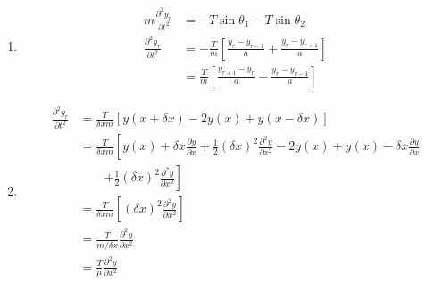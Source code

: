 \documentclass{article}
\begin{document}
\begin{enumerate}
  \item

        \begin{align*}
          m \frac{\partial^2 y_r}{\partial t^2} & = - T \sin \theta_1 - T \sin \theta_2                                               \\
          \frac{\partial^2 y_r}{\partial t^2}   & = -\frac{T}{m} \left[ \frac{y_r - y_{r - 1}}{a} + \frac{y_r - y_{r + 1}}{a} \right] \\
                                                & = \frac{T}{m} \left[ \frac{y_{r + 1} - y_r}{a} - \frac{y_r - y_{r - 1}}{a} \right]
        \end{align*}

  \item

        \begin{align*}
          \frac{\partial^2 y_r}{\partial t^2} & = \frac{T}{\delta x m} [y(x + \delta x) - 2 y(x) + y(x - \delta x)]                                                                                                                                       \\
                                              & = \frac{T}{\delta x m} \left[ y(x) + \delta x \frac{\partial y}{\partial x} + \frac{1}{2} (\delta x)^2 \frac{\partial^2 y}{\partial x^2} - 2 y(x) + y(x) - \delta x \frac{\partial y}{\partial x} \right. \\
                                              & \qquad \left. + \frac{1}{2} (\delta x)^2 \frac{\partial^2 y}{\partial x^2} \right]                                                                                                                        \\
                                              & = \frac{T}{\delta x m} \left[ (\delta x)^2 \frac{\partial^2 y}{\partial x^2} \right]                                                                                                                      \\
                                              & = \frac{T}{m / \delta x} \frac{\partial^2 y}{\partial x^2}                                                                                                                                                \\
                                              & = \frac{T}{\mu} \frac{\partial^2 y}{\partial x^2}
        \end{align*}
\end{enumerate}
\end{document}
